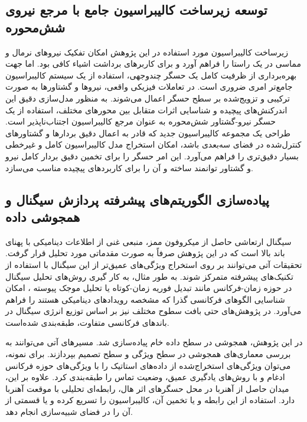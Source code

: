 \subsection{توسعه زیرساخت کالیبراسیون جامع با مرجع نیروی شش‌محوره}
زیرساخت کالیبراسیون مورد استفاده در این پژوهش امکان تفکیک نیروهای نرمال و مماسی در یک راستا را فراهم آورد و برای کاربر‌های برداشت اشیاء کافی بود. اما جهت بهره‌برداری از ظرفیت کامل یک حسگر چندوجهی، استفاده از یک سیستم کالیبراسیون جامع‌تر امری ضروری است. در تعاملات فیزیکی واقعی، نیروها و گشتاورها به صورت ترکیبی و تزویج‌شده بر سطح حسگر اعمال می‌شوند. به منظور مدل‌سازی دقیق این اندرکنش‌های پیچیده و شناسایی اثرات متقابل بین محورهای مختلف، استفاده از یک حسگر نیرو-گشتاور شش‌محوره به عنوان مرجع کالیبراسیون اجتناب‌ناپذیر است.
طراحی یک مجموعه کالیبراسیون جدید که قادر به اعمال دقیق بردارها و گشتاورهای کنترل‌شده در فضای سه‌بعدی باشد، امکان استخراج مدل کالیبراسیون کامل و غیرخطی بسیار دقیق‌تری را فراهم می‌آورد. این امر حسگر را برای تخمین دقیق بردار کامل نیرو و گشتاور توانمند ساخته و آن را برای کاربردهای پیچیده مناسب می‌سازد.
\subsection{پیاده‌سازی الگوریتم‌های پیشرفته پردازش سیگنال و همجوشی داده}

سیگنال ارتعاشی حاصل از میکروفون ممز، منبعی غنی از اطلاعات دینامیکی با پهنای باند بالا است که در این پژوهش صرفاً به صورت مقدماتی مورد تحلیل قرار گرفت. تحقیقات آتی می‌توانند بر روی استخراج ویژگی‌های عمیق‌تر از این سیگنال با استفاده از تکنیک‌های پیشرفته متمرکز شوند. به طور مثال، به کار گیری روش‌های تحلیل سیگنال در حوزه زمان-فرکانس مانند تبدیل فوریه زمان-کوتاه
یا تحلیل موجک پیوسته
، امکان شناسایی الگوهای فرکانسی گذرا که مشخصه رویدادهای دینامیکی هستند را فراهم می‌آورد. در پژوهش‌های
\cite{chang2024investigation,yu2023mimictouch}
 حتی بافت سطوح مختلف نیز بر اساس توزیع انرژی سیگنال در باندهای فرکانسی متفاوت، طبقه‌بندی شده‌است.

در این پژوهش، همجوشی در سطح داده خام پیاده‌سازی شد. مسیرهای آتی می‌توانند به بررسی معماری‌های همجوشی در سطح ویژگی و سطح تصمیم  بپردازند. برای نمونه، می‌توان ویژگی‌های استخراج‌شده از داده‌های استاتیک را با ویژگی‌های حوزه فرکانس ادغام و با روش‌های یادگیری عمیق، وضعیت تماس را طبقه‌بندی کرد. علاوه بر این، میدان حاصل از آهنربا در محل حسگر‌های اثر هال، رابطه‌ای تحلیلی با موقعت آهنربا دارد. استفاده از این رابطه و یا تخمین آن، کالیبراسیون را تسریع کرده و یا قسمتی از آن را در فضای شبیه‌سازی انجام دهد.

